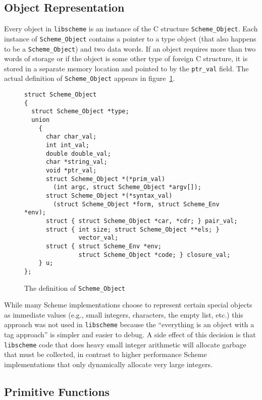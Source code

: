 \subsection{Object Representation}
\label{sec:object}

Every object in \verb+libscheme+ is an instance of the C structure
\verb+Scheme_Object+.  Each instance of \verb+Scheme_Object+ contains
a pointer to a type object (that also happens to be a
\verb+Scheme_Object+) and two data words.  If an object requires more
than two words of storage or if the object is some other type of
foreign C structure, it is stored in a separate memory location and
pointed to by the \verb+ptr_val+ field.  The actual definition of
\verb+Scheme_Object+ appears in figure~\ref{fig:schemeobj}.

\begin{figure}[htbp]
\begin{center}
\begin{verbatim}
struct Scheme_Object
{
  struct Scheme_Object *type;
  union
    {
      char char_val;
      int int_val;
      double double_val;
      char *string_val;
      void *ptr_val;
      struct Scheme_Object *(*prim_val)
        (int argc, struct Scheme_Object *argv[]);
      struct Scheme_Object *(*syntax_val)
        (struct Scheme_Object *form, struct Scheme_Env *env);
      struct { struct Scheme_Object *car, *cdr; } pair_val;
      struct { int size; struct Scheme_Object **els; } 
               vector_val;
      struct { struct Scheme_Env *env; 
               struct Scheme_Object *code; } closure_val;
    } u;
};
\end{verbatim}
\end{center}
\caption{The definition of {\tt Scheme\_Object}}
\label{fig:schemeobj}
\end{figure}

While many Scheme implementations choose to represent certain special
objects as immediate values (e.g., small integers, characters, the
empty list, etc.) this approach was not used in \verb+libscheme+
because the ``everything is an object with a tag approach'' is simpler
and easier to debug.  A side effect of this decision is that
\verb+libscheme+ code that does heavy small integer arithmetic will
allocate garbage that must be collected, in contrast to higher
performance Scheme implementations that only dynamically allocate very
large integers.

\subsection{Primitive Functions}

